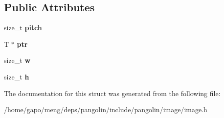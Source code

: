 \subsection*{Public Attributes}
\begin{DoxyCompactItemize}
\item 
size\+\_\+t {\bfseries pitch}\hypertarget{structpangolin_1_1_image_a70f559cf9e8398af39d4486439d981e1}{}\label{structpangolin_1_1_image_a70f559cf9e8398af39d4486439d981e1}

\item 
T $\ast$ {\bfseries ptr}\hypertarget{structpangolin_1_1_image_a4c550102df312a014e657dcb076203b4}{}\label{structpangolin_1_1_image_a4c550102df312a014e657dcb076203b4}

\item 
size\+\_\+t {\bfseries w}\hypertarget{structpangolin_1_1_image_a8caedfed88f720430131432fff4dd7dc}{}\label{structpangolin_1_1_image_a8caedfed88f720430131432fff4dd7dc}

\item 
size\+\_\+t {\bfseries h}\hypertarget{structpangolin_1_1_image_af76464116b2127b055e912547be0d507}{}\label{structpangolin_1_1_image_af76464116b2127b055e912547be0d507}

\end{DoxyCompactItemize}


The documentation for this struct was generated from the following file\+:\begin{DoxyCompactItemize}
\item 
/home/gapo/meng/deps/pangolin/include/pangolin/image/image.\+h\end{DoxyCompactItemize}
